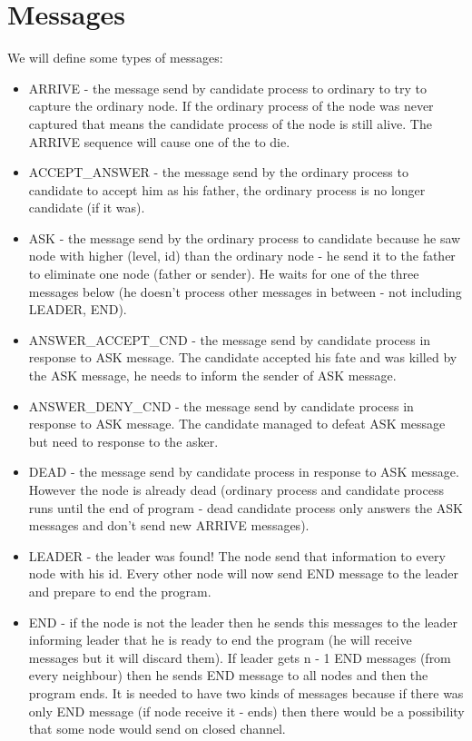 \documentclass{article}
\begin{document}
\section*{Messages}
We will define some types of messages:
\begin{itemize}
    \item ARRIVE - the message send by candidate process to ordinary to try to capture the ordinary node. If the ordinary process of the node was never captured that means the candidate process of the node is still alive. The ARRIVE sequence will cause one of the to die.
    \item ACCEPT\_ANSWER - the message send by the ordinary process to candidate to accept him as his father, the ordinary process is no longer candidate (if it was).
    \item ASK - the message send by the ordinary process to candidate because he saw node with higher (level, id) than the ordinary node - he send it to the father to eliminate one node (father or sender). He waits for one of the three messages below (he doesn't process other messages in between - not including LEADER, END).
    \item ANSWER\_ACCEPT\_CND - the message send by candidate process in response to ASK message. The candidate accepted his fate and was killed by the ASK message, he needs to inform the sender of ASK message.
    \item ANSWER\_DENY\_CND - the message send by candidate process in response to ASK message. The candidate managed to defeat ASK message but need to response to the asker.
    \item DEAD - the message send by candidate process in response to ASK message. However the node is already dead (ordinary process and candidate process runs until the end of program - dead candidate process only answers the ASK messages and don't send new ARRIVE messages).
    \item LEADER - the leader was found! The node send that information to every node with his id. Every other node will now send END message to the leader and prepare to end the program.
    \item END - if the node is not the leader then he sends this messages to the leader informing leader that he is ready to end the program (he will receive messages but it will discard them). If leader gets n - 1 END messages (from every neighbour) then he sends END message to all nodes and then the program ends. It is needed to have two kinds of messages because if there was only END message (if node receive it - ends) then there would be a possibility that some node would send on closed channel.
\end{itemize}
\end{document}
